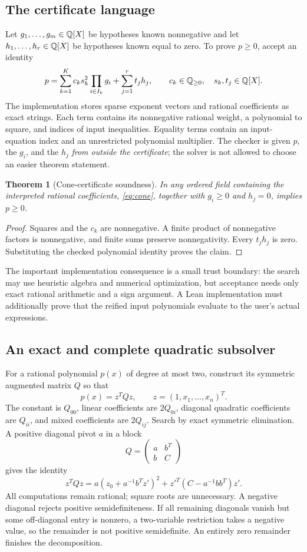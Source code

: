 \documentclass[11pt,letterpaper]{article}
\newtheorem{theorem}{Theorem}[section]
\theoremstyle{definition}\newtheorem{definition}[theorem]{Definition}
\theoremstyle{remark}\newtheorem{remark}[theorem]{Remark}
\begin{document}
\subsection{The certificate language}
Let $g_1,\ldots,g_m\in\mathbb{Q}[X]$ be hypotheses known nonnegative and let $h_1,\ldots,h_r\in\mathbb{Q}[X]$ be hypotheses known equal to zero. To prove $p\ge0$, accept an identity
\begin{equation}\label{eq:cone}
 p=\sum_{k=1}^{K} c_k s_k^2\prod_{i\in I_k}g_i
      +\sum_{j=1}^{r}t_jh_j,
 \qquad c_k\in\mathbb{Q}_{\ge0},\quad s_k,t_j\in\mathbb{Q}[X].
\end{equation}
The implementation stores sparse exponent vectors and rational coefficients as exact strings. Each term contains its nonnegative rational weight, a polynomial to square, and indices of input inequalities. Equality terms contain an input-equation index and an unrestricted polynomial multiplier. The checker is given $p$, the $g_i$, and the $h_j$ \emph{from outside the certificate}; the solver is not allowed to choose an easier theorem statement.

\begin{theorem}[Cone-certificate soundness]
In any ordered field containing the interpreted rational coefficients, \eqref{eq:cone}, together with $g_i\ge0$ and $h_j=0$, implies $p\ge0$.
\end{theorem}
\begin{proof}
Squares and the $c_k$ are nonnegative. A finite product of nonnegative factors is nonnegative, and finite sums preserve nonnegativity. Every $t_jh_j$ is zero. Substituting the checked polynomial identity proves the claim.
\end{proof}
The important implementation consequence is a small trust boundary: the search may use heuristic algebra and numerical optimization, but acceptance needs only exact rational arithmetic and a sign argument. A Lean implementation must additionally prove that the reified input polynomials evaluate to the user's actual expressions.

\subsection{An exact and complete quadratic subsolver}
For a rational polynomial $p(x)$ of degree at most two, construct its symmetric augmented matrix $Q$ so that
\[
 p(x)=z^TQz,\qquad z=(1,x_1,\ldots,x_n)^T.
\]
The constant is $Q_{00}$, linear coefficients are $2Q_{0i}$, diagonal quadratic coefficients are $Q_{ii}$, and mixed coefficients are $2Q_{ij}$. Search by exact symmetric elimination. A positive diagonal pivot $a$ in a block
\[
 Q=\begin{pmatrix}a&b^T\\b&C\end{pmatrix}
\]
gives the identity
\[
 z^TQz=a\left(z_0+a^{-1}b^Tz'\right)^2
            +z'^T\left(C-a^{-1}bb^T\right)z'.
\]
All computations remain rational; square roots are unnecessary. A negative diagonal rejects positive semidefiniteness. If all remaining diagonals vanish but some off-diagonal entry is nonzero, a two-variable restriction takes a negative value, so the remainder is not positive semidefinite. An entirely zero remainder finishes the decomposition.
\end{document}
